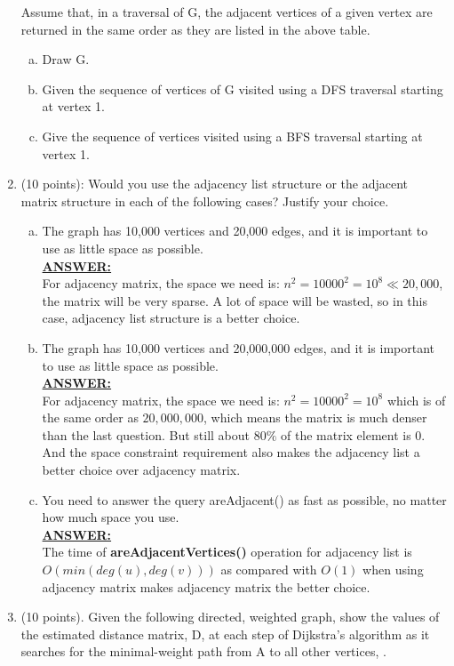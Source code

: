 \documentclass{article}
\newcommand{\answer}{\textbf{\\\underline{ANSWER:}\\}}
\begin{document}
\begin{enumerate}
Assume that, in a traversal of G, the adjacent vertices of a given
vertex are returned in the same order as they are listed in the above
table.

\begin{enumerate}[a.]
\item Draw G. \\

\item Given the sequence of vertices of G visited using a DFS traversal
starting at vertex 1. 

\item Give the sequence of vertices visited using a BFS traversal starting
at vertex 1. 
\end{enumerate}

\item (10 points): Would you use the adjacency list structure or the
  adjacent matrix structure in each of the following cases? Justify
  your choice. 
\begin{enumerate}[a.]
\item The graph has 10,000 vertices and 20,000 edges, and it is important
to use as little space as possible.
\answer For adjacency matrix, the space we need is: $n^2=10000^2=10^8\ll
20,000$, the matrix will be very sparse. A lot of space will be
wasted, so in this case, adjacency list structure is a better choice. 
 
\item The graph has 10,000 vertices and 20,000,000 edges, and it is
important to use as little space as possible.
\answer For adjacency matrix, the space we need is: $n^2=10000^2=10^8$
which is of the same order as $20,000,000$, which means the matrix is
much denser than the last question. But still about $80\%$ of the
matrix element is 0. And the space constraint requirement also makes
the adjacency list a better choice over adjacency matrix. 

\item You need to answer the query areAdjacent() as fast as possible, no
matter how much space you use.
\answer The time of \textbf{areAdjacentVertices()} operation for
adjacency list is $O(min(deg(u),deg(v)))$ as compared with $O(1)$ when
using adjacency matrix makes adjacency matrix the better choice. 

\end{enumerate}

\item (10 points). Given the following directed, weighted graph, show
  the values of the estimated distance matrix, D, at each step of
  Dijkstra’s algorithm as it searches for the minimal-weight path from A
  to all other vertices, .
 

\end{enumerate}
\end{document}

